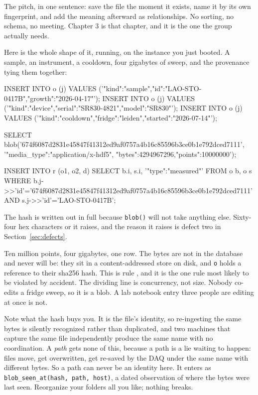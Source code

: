 The pitch, in one sentence: save the file the moment it exists, name it by its own fingerprint, and add the meaning afterward as relationships. No sorting, no schema, no meeting. Chapter 3 is that chapter, and it is the one the group actually needs.

Here is the whole shape of it, running, on the instance you just booted. A sample, an instrument, a cooldown, four gigabytes of sweep, and the provenance tying them together:

\begin{Check}
INSERT INTO o (j) VALUES ('{"kind":"sample","id":"LAO-STO-0417B","growth":"2026-04-17"}');
INSERT INTO o (j) VALUES ('{"kind":"device","serial":"SR830-4821","model":"SR830"}');
INSERT INTO o (j) VALUES ('{"kind":"cooldown","fridge":"leiden","started":"2026-07-14"}');

SELECT blob('674f6087d2831e45847f41312ed9af0757a4b16c85596b3ce0b1e792dced7111',
            '{"media_type":"application/x-hdf5",
              "bytes":4294967296,"points":10000000}');

INSERT INTO r (o1, o2, d)
  SELECT b.i, s.i, '{"type":"measured"}'
  FROM o b, o s
  WHERE b.j->>'id'='674f6087d2831e45847f41312ed9af0757a4b16c85596b3ce0b1e792dced7111'
    AND s.j->>'id'='LAO-STO-0417B';
\end{Check}

The hash is written out in full because \texttt{blob()} will not take anything else. Sixty-four hex characters or it raises, and the reason it raises is defect two in Section~\ref{sec:defects}.

Ten million points, four gigabytes, one row. The bytes are not in the database and never will be: they sit in a content-addressed store on disk, and \texttt{o} holds a reference to their sha256 hash. This is rule , and it is the one rule most likely to be violated by accident. The dividing line is concurrency, not size. Nobody co-edits a fridge sweep, so it is a blob. A lab notebook entry three people are editing at once is not.

Note what the hash buys you. It is the file's identity, so re-ingesting the same bytes is silently recognized rather than duplicated, and two machines that capture the same file independently produce the same name with no coordination. A \emph{path} gets none of this, because a path is a lie waiting to happen: files move, get overwritten, get re-saved by the DAQ under the same name with different bytes. So a path can never be an identity here. It enters as \texttt{blob\_seen\_at(hash, path, host)}, a dated observation of where the bytes were last seen. Reorganize your folders all you like; nothing breaks.

